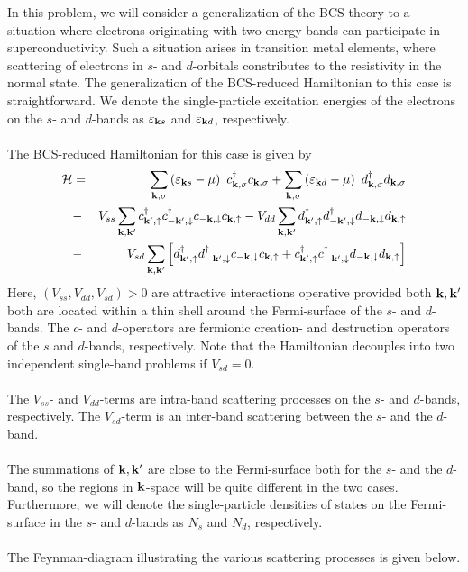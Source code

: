 \begin{problem}
	In this problem, we will consider a generalization of the BCS-theory to a situation where electrons originating with two energy-bands can participate in superconductivity. Such a situation arises in transition metal elements, where scattering of electrons in $s$- and $d$-orbitals constributes to the resistivity in the normal state. The generalization of the BCS-reduced Hamiltonian to this case is  straightforward. We denote the single-particle excitation energies of the electrons on the $s$- and $d$-bands as $\varepsilon_{{\bf k} s}$ and $\varepsilon_{{\bf k} d}$, respectively.
	\ \\
	\ \\
	The BCS-reduced Hamiltonian for this case is given by
	\begin{eqnarray}
		\mathcal{H}&  = &  \sum_{{\bf k},\sigma} \left( \varepsilon_{{\bf k} s} - \mu \right) ~ c^{\dagger}_{{\bf k},\sigma} c_{{\bf k},\sigma}
		+  \sum_{{\bf k},\sigma} \left( \varepsilon_{{\bf k} d} - \mu \right)  ~ d^{\dagger}_{{\bf k},\sigma} d_{{\bf k},\sigma} \nonumber \\
		& - & V_{ss} \sum_{{\bf k},{\bf k}^{\prime}} c^{\dagger}_{{\bf k}^{\prime},\uparrow}c^{\dagger}_{-{\bf k}^{\prime},\downarrow}
		c_{-{\bf k},\downarrow}c_{{\bf k},\uparrow}
		- V_{dd} \sum_{{\bf k},{\bf k}^{\prime}} d^{\dagger}_{{\bf k}^{\prime},\uparrow}d^{\dagger}_{-{\bf k}^{\prime},\downarrow}
		d_{-{\bf k},\downarrow} d_{{\bf k},\uparrow} \nonumber \\
		& - & V_{sd} \sum_{{\bf k},{\bf k}^{\prime}} \left[  d^{\dagger}_{{\bf k}^{\prime},\uparrow}d^{\dagger}_{-{\bf k}^{\prime},\downarrow}
		c_{-{\bf k},\downarrow} c_{{\bf k},\uparrow} 
		+c^{\dagger}_{{\bf k}^{\prime},\uparrow}c^{\dagger}_{-{\bf k}^{\prime},\downarrow}
		d_{-{\bf k},\downarrow} d_{{\bf k},\uparrow} \nonumber
		\right]
	\end{eqnarray}
	Here, $(V_{ss}, V_{dd}, V_{sd})>0$ are attractive interactions operative provided both ${\bf k},{\bf k}^{\prime}$ both are located within a thin shell around the Fermi-surface of the $s$- and $d$-bands. The $c$- and  $d$-operators are fermionic creation- and destruction operators of the $s$ and $d$-bands,  respectively. Note that the Hamiltonian decouples into two independent single-band problems if $V_{sd}=0$.
	\ \\
	\ \\
	The $V_{ss}$- and $V_{dd}$-terms are intra-band scattering processes on the $s$- and $d$-bands, respectively. The $V_{sd}$-term is an inter-band scattering between the $s$- and the $d$-band. 
	\ \\
	\ \\
	The summations of ${\bf k},{\bf k}^{\prime}$
	are close to the Fermi-surface both for the $s$- and the $d$-band, so the regions in ${\bf k}$-space will be quite different in the two cases. Furthermore, we will denote the single-particle densities of states on the Fermi-surface in the $s$- and $d$-bands as $N_s$ and $N_d$, respectively. 
	\ \\
	\ \\
	The Feynman-diagram illustrating the various scattering processes is given below. 
	\vskip 1.0cm
	

\end{problem}
